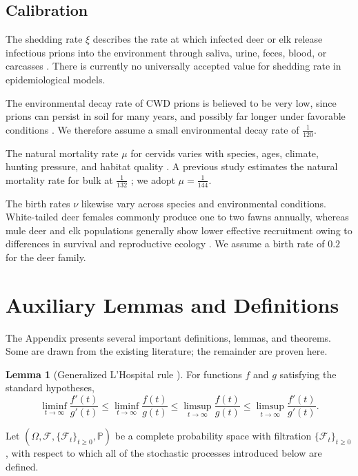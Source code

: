 \documentclass[12pt,a4paper,reqno]{amsart}
\theoremstyle{definition}
\newtheorem{lemma}[theorem]{Lemma}
\theoremstyle{remark}
\theoremstyle{plain}
\begin{document}
\subsection{Calibration}
The shedding rate $\xi$ describes the rate at which infected deer or elk release infectious prions into the environment through saliva, urine, feces, blood, or carcasses \cite{denkers2024temporal}. There is currently no universally accepted value for shedding rate in epidemiological models.

The environmental decay rate of CWD prions is believed to be very low, since prions can persist in soil for many years, and possibly far longer under favorable conditions \cite{miller2004environmental}. We therefore assume a small environmental decay rate of $\frac{1}{120}$.

The natural mortality rate $\mu$ for cervids varies with species, ages, climate, hunting pressure, and habitat quality  \cite{schuyler2019effects}. A previous study estimates the natural mortality rate for bulk at $\frac{1}{132}$  \cite{islam2022modeling}; we adopt $\mu = \frac{1}{144}$.

The birth rates $\nu$ likewise vary across species and environmental conditions. White-tailed deer females commonly produce one to two fawns annually, whereas mule deer and elk populations generally show lower effective recruitment owing to differences in survival and reproductive ecology \cite{miller2006dynamics, cross2025predictions}. We assume a birth rate of $0.2$ for the deer family.


\section{Auxiliary Lemmas and Definitions}
The Appendix presents several important definitions, lemmas, and theorems. Some are drawn from the existing literature; the remainder are proven here.
\begin{lemma}[Generalized L'Hospital rule \cite{Lee1977Generalizations}]\label{lHop}
For functions $f$ and $g$ satisfying the standard hypotheses,
\begin{equation} \label{gen_LHospital}
    \liminf_{t\to \infty} \dfrac{f'(t)}{g'(t)} \leq \liminf_{t\to \infty} \dfrac{f(t)}{g(t)} \leq \limsup_{t\to \infty} \dfrac{f(t)}{g(t)} \leq \limsup_{t\to \infty} \dfrac{f'(t)}{g'(t)}.
\end{equation}
\end{lemma}

Let $(\Omega,\mathcal{F},\{\mathcal{F}_t\}_{t\geq 0},\mathbb{P})$ be a complete probability space with filtration $\{\mathcal{F}_t\}_{t\geq 0}$, with respect to which all of the stochastic processes introduced below are defined.
\end{document}
